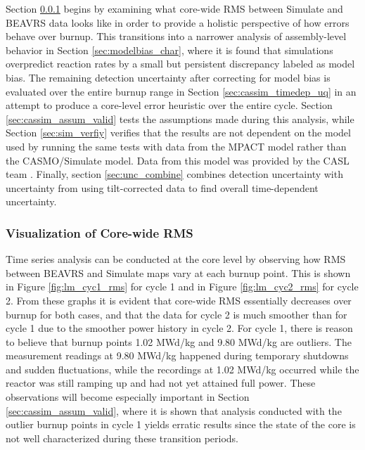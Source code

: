 \documentclass{article}
\begin{document}
Section \ref{sec:corewide_rms} begins by examining what core-wide RMS between Simulate and BEAVRS data looks like in order to provide a holistic perspective of how errors behave over burnup. This transitions into a narrower analysis of assembly-level behavior in Section \ref{sec:modelbias_char}, where it is found that simulations overpredict reaction rates by a small but persistent discrepancy labeled as model bias. The remaining detection uncertainty after correcting for model bias is evaluated over the entire burnup range in Section \ref{sec:cassim_timedep_uq} in an attempt to produce a core-level error heuristic over the entire cycle. Section \ref{sec:cassim_assum_valid} tests the assumptions made during this analysis, while Section \ref{sec:sim_verfiy} verifies that the results are not dependent on the model used by running the same tests with data from the MPACT model rather than the CASMO/Simulate model. Data from this model was provided by the CASL team \cite{collinsComm}. Finally, section \ref{sec:unc_combine} combines detection uncertainty with uncertainty from using tilt-corrected data to find overall time-dependent uncertainty.

\subsubsection{Visualization of Core-wide RMS}\label{sec:corewide_rms}

Time series analysis can be conducted at the core level by observing how RMS between BEAVRS and Simulate maps vary at each burnup point. This is shown in Figure \ref{fig:lm_cyc1_rms} for cycle 1 and in Figure \ref{fig:lm_cyc2_rms} for cycle 2. From these graphs it is evident that core-wide RMS essentially decreases over burnup for both cases, and that the data for cycle 2 is much smoother than for cycle 1 due to the smoother power history  in cycle 2. For cycle 1, there is reason to believe that burnup points 1.02 MWd/kg and 9.80 MWd/kg are outliers. The measurement readings at 9.80 MWd/kg happened during temporary shutdowns and sudden fluctuations, while the recordings at 1.02 MWd/kg occurred while the reactor was still ramping up and had not yet attained full power. These observations will become especially important in Section \ref{sec:cassim_assum_valid}, where it is shown that analysis conducted with the outlier burnup points in cycle 1 yields erratic results since the state of the core is not well characterized during these transition periods.
\end{document}
